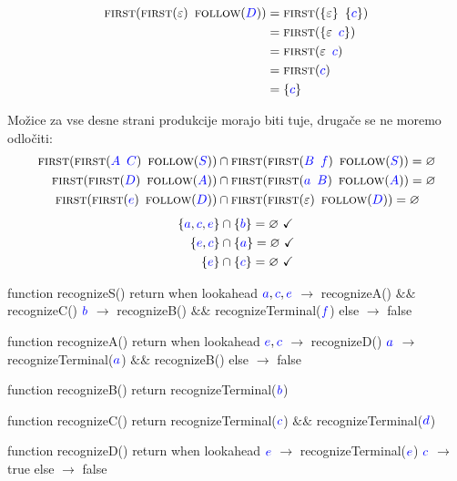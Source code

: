 \documentclass{article}
\newcommand{\FIRST}{\textsc{first}}
\newcommand{\OK}{\ \checkmark}
\newcommand{\FOLLOW}{\textsc{follow}}
\newcommand{\Symbol}[1]{\textcolor{blue}{#1}}
\newcommand{\Empty}{\varnothing}
\newcommand{\Null}{\varepsilon}
\newcommand{\Seq}{{\ \,}}
\begin{document}
\begin{align*}
  \FIRST(\FIRST(\Null) \Seq \FOLLOW(\Symbol{D})) &= \FIRST(\{\Null\} \Seq \{\Symbol{c}\})\\
  &= \FIRST(\{\Null \Seq \Symbol{c}\})\\
  &= \FIRST(\Null \Seq \Symbol{c})\\ 
  &= \FIRST(\Symbol{c})\\
  &= \{\Symbol{c}\}
\end{align*}

Možice za vse desne strani produkcije morajo biti tuje, drugače se ne moremo odločiti:
\begin{align*}
  \FIRST(\FIRST(\Symbol{A} \Seq \Symbol{C}) \Seq \FOLLOW(\Symbol{S})) &\cap \FIRST(\FIRST(\Symbol{B} \Seq \Symbol{f}) \Seq \FOLLOW(\Symbol{S})) = \Empty\\
  \FIRST(\FIRST(\Symbol{D}) \Seq \FOLLOW(\Symbol{A})) &\cap \FIRST(\FIRST(\Symbol{a} \Seq \Symbol{B}) \Seq \FOLLOW(\Symbol{A})) = \Empty\\
  \FIRST(\FIRST(\Symbol{e}) \Seq \FOLLOW(\Symbol{D})) &\cap \FIRST(\FIRST(\Null) \Seq \FOLLOW(\Symbol{D})) = \Empty
\end{align*}
\begin{align*}
  \{\Symbol{a}, \Symbol{c}, \Symbol{e}\} &\cap \{\Symbol{b}\} = \Empty \OK\\
  \{\Symbol{e}, \Symbol{c}\} &\cap \{\Symbol{a}\} = \Empty \OK\\
  \{\Symbol{e}\} &\cap \{\Symbol{c}\} = \Empty \OK
\end{align*}

\begin{algorithm}
  function recognizeS()
    return when lookahead
      $\Symbol{a}, \Symbol{c}, \Symbol{e}$ $\rightarrow$ recognizeA() $\&\&$ recognizeC()
      $\Symbol{b}$ $\rightarrow$ recognizeB() $\&\&$ recognizeTerminal($\Symbol{f}$)
      else $\rightarrow$ false

  function recognizeA()
    return when lookahead
      $\Symbol{e}, \Symbol{c}$ $\rightarrow$ recognizeD()
      $\Symbol{a}$ $\rightarrow$ recognizeTerminal($\Symbol{a}$) $\&\&$ recognizeB()
      else $\rightarrow$ false

  function recognizeB()
    return recognizeTerminal($\Symbol{b}$)

  function recognizeC()
    return recognizeTerminal($\Symbol{c}$) $\&\&$ recognizeTerminal($\Symbol{d}$)

  function recognizeD()
    return when lookahead
      $\Symbol{e}$ $\rightarrow$ recognizeTerminal($\Symbol{e}$)
      $\Symbol{c}$ $\rightarrow$ true
      else $\rightarrow$ false
\end{algorithm}
\end{document}
